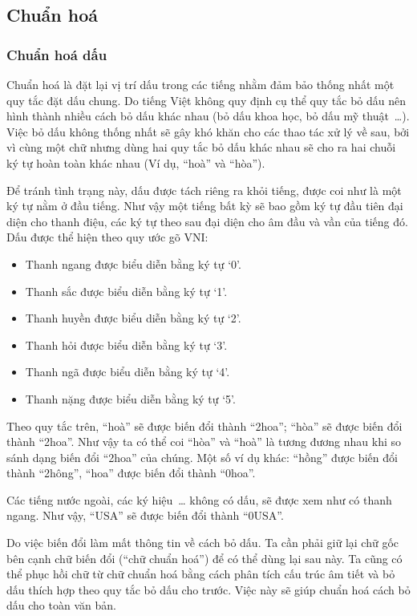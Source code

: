 \documentclass[a4paper,oneside,14pt]{extbook} %
\begin{document}
\subsection{Chuẩn hoá}


\subsubsection{Chuẩn hoá dấu}

Chuẩn hoá là đặt lại vị trí dấu trong các tiếng nhằm đảm bảo thống
nhất một quy tắc đặt dấu chung. Do tiếng Việt không quy định cụ thể
quy tắc bỏ dấu nên hình thành nhiều cách bỏ dấu khác nhau (bỏ dấu khoa
học, bỏ dấu mỹ thuật~\ldots). Việc bỏ dấu không thống nhất sẽ gây khó
khăn cho các thao tác xử lý về sau, bởi vì cùng một chữ nhưng dùng hai
quy tắc bỏ dấu khác nhau sẽ cho ra hai chuỗi ký tự hoàn toàn khác nhau
(Ví dụ, ``hoà'' và ``hòa''). 

Để tránh tình trạng này, dấu được tách
riêng ra khỏi tiếng, được coi như là một ký tự nằm ở đầu tiếng. Như
vậy một tiếng bất kỳ sẽ bao gồm ký tự đầu tiên đại diện cho thanh
điệu, các ký tự theo sau đại diện cho âm đầu và vần của tiếng đó. Dấu
được thể hiện theo quy ước gõ VNI:
\begin{itemize}
\item Thanh ngang được biểu diễn bằng ký tự `0'.
\item Thanh sắc được biểu diễn bằng ký tự `1'.
\item Thanh huyền được biểu diễn bằng ký tự `2'.
\item Thanh hỏi được biểu diễn bằng ký tự `3'.
\item Thanh ngã được biểu diễn bằng ký tự `4'.
\item Thanh nặng được biểu diễn bằng ký tự `5'.
\end{itemize}

Theo quy tắc trên, ``hoà'' sẽ được biến đổi thành ``2hoa'';
``hòa'' sẽ được biến đổi thành ``2hoa''. Như vậy ta có thể coi ``hòa''
và ``hoà'' là tương đương nhau khi so sánh dạng biến đổi ``2hoa'' của
chúng. Một số ví dụ khác: ``hồng'' được biến đổi thành ``2hông'',
``hoa'' được biến đổi thành ``0hoa''.

Các tiếng nước ngoài, các ký hiệu~\ldots{} không có dấu, sẽ được xem như
có thanh ngang. Như vậy, ``USA'' sẽ được biến đổi thành ``0USA''.

Do việc biến đổi làm mất thông tin về cách bỏ dấu. Ta cần phải giữ lại
chữ gốc bên cạnh chữ biến đổi (``chữ chuẩn hoá'') để có thể dùng lại
sau này. Ta cũng có thể phục hồi chữ từ chữ chuẩn hoá bằng cách phân
tích cấu trúc âm tiết và bỏ dấu thích hợp theo quy tắc bỏ dấu cho
trước. Việc này sẽ giúp chuẩn hoá cách bỏ dấu cho toàn văn bản.
\end{document}
